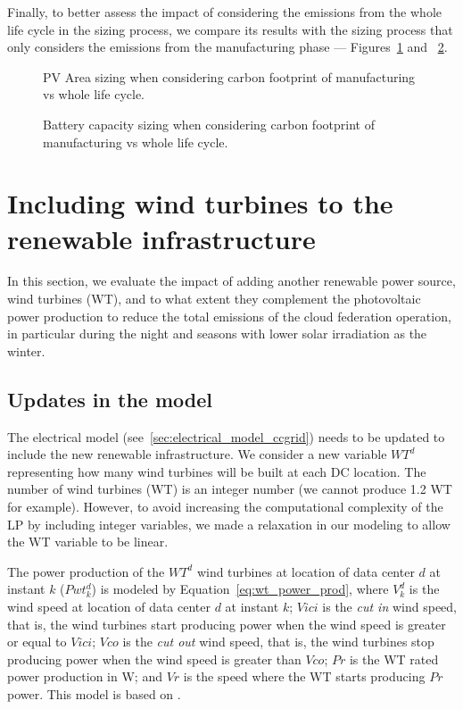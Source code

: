 Finally, to better assess the impact of considering the emissions from the whole life cycle in the sizing process, we compare its results with the sizing process that only considers the emissions from the manufacturing phase --- Figures~\ref{fig:pv_lca} and ~\ref{fig:bat_lca}.


\begin{figure}[h]
  \centering
  {}
  \caption{PV Area sizing when considering carbon footprint of manufacturing vs whole life cycle. }
  \label{fig:pv_lca}
\end{figure}


\begin{figure}[h]
  \centering
  {}
  \caption{Battery capacity sizing when considering carbon footprint of manufacturing vs whole life cycle.  }
  \label{fig:bat_lca}
\end{figure}



\section{Including wind turbines to the renewable infrastructure}
\label{sec:add_wt}
In this section, we evaluate the impact of adding another renewable power source, wind turbines (WT), and to what extent they complement the photovoltaic power production to reduce the total emissions of the cloud federation operation, in particular during the night and seasons with lower solar irradiation as the winter.

\subsection{Updates in the model}
\label{sec:ex_model_wt}

The electrical model (see~\ref{sec:electrical_model_ccgrid}) needs to be updated to include the new renewable infrastructure. We consider a new variable $WT^d$ representing how many wind turbines will be built at each DC location. The number of wind turbines (WT) is an integer number (we cannot produce 1.2 WT for example). However, to avoid increasing the computational complexity of the LP by including integer variables, we made a relaxation in our modeling to allow the WT variable to be linear. 

The power production of the $WT^d$ wind turbines at location of data center $d$ at instant $k$ ($Pwt^d_{k}$) is modeled by Equation~\ref{eq:wt_power_prod}, where $V^d_k$ is the wind speed at location of data center $d$ at instant $k$; $Vici$ is the \textit{cut in} wind speed, that is, the wind turbines start producing power when the wind speed is greater or equal to $Vici$; $Vco$ is the \textit{cut out} wind speed, that is, the wind turbines stop producing power when the wind speed is greater than $Vco$; $Pr$ is the WT rated power production in W; and $Vr$ is the speed where the WT starts producing $Pr$ power. This model is based on \cite{HADDAD2021100505}.



